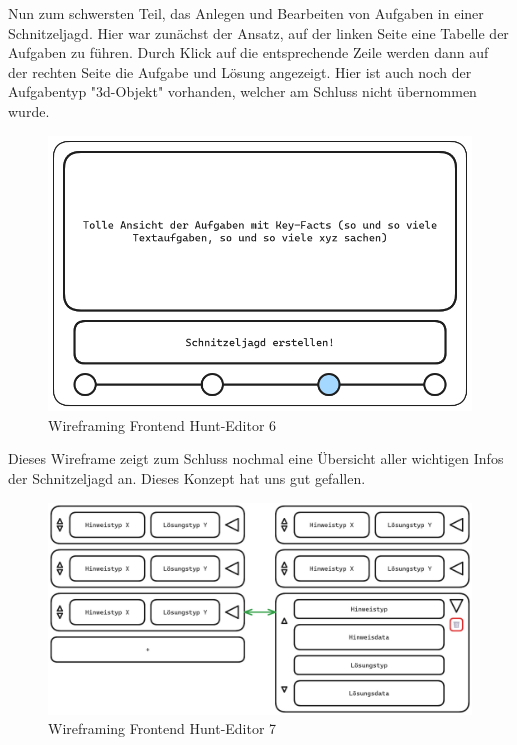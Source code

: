 Nun zum schwersten Teil, das Anlegen und Bearbeiten von Aufgaben in einer Schnitzeljagd. Hier war zunächst der Ansatz, auf der linken Seite eine Tabelle der Aufgaben zu führen. Durch Klick auf die entsprechende Zeile werden dann auf der rechten Seite die Aufgabe und Lösung angezeigt. Hier ist auch noch der Aufgabentyp "3d-Objekt" vorhanden, welcher am Schluss nicht übernommen wurde. 

\begin{figure}[H]
  \centering
  \includegraphics[width=1\textwidth]{images/wireframing/PrAr_Scavhunt_Wireframing-2.4.png}
  \caption{Wireframing Frontend Hunt-Editor 6}
  \label{fig:wireframing-frontend-hunt-editor-6}
\end{figure}

Dieses Wireframe zeigt zum Schluss nochmal eine Übersicht aller wichtigen Infos der Schnitzeljagd an. Dieses Konzept hat uns gut gefallen. 

\begin{figure}[H]
  \centering
  \includegraphics[width=1\textwidth]{images/wireframing/PrAr_Scavhunt_Wireframing-3.png}
  \caption{Wireframing Frontend Hunt-Editor 7}
  \label{fig:wireframing-frontend-hunt-editor-7}
\end{figure}

